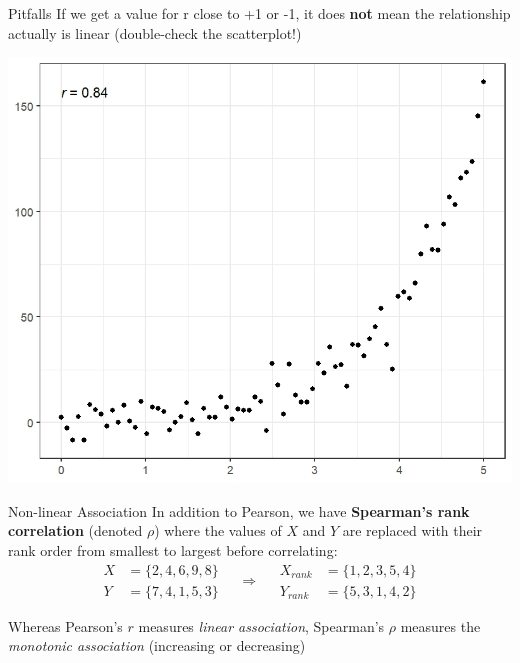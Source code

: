 \documentclass{beamer}
\begin{document}
\begin{frame}{Pitfalls}
If we get a value for r close to +1 or -1, it does \textbf{not} mean the relationship actually is linear (double-check the scatterplot!)
\begin{center}
    \includegraphics[scale=.55]{img/nonlinear_corr_ex.jpeg}
\end{center}
\end{frame}



\begin{frame}{Non-linear Association}
In addition to Pearson, we have \textbf{Spearman's rank correlation} (denoted $\rho$) where the values of $X$ and $Y$ are replaced with their rank order from smallest to largest before correlating:
$$
\begin{aligned}
X &= \{2,4,6,9,8 \} \\
Y &= \{7,4,1,5,3 \} 
\end{aligned}
 \quad
 \Longrightarrow
 \quad
\begin{aligned}
X_{rank} &= \{1,2,3,5,4 \} \\
Y_{rank} &= \{5,3,1,4, 2\} 
\end{aligned}
$$

\vspace{4mm}

Whereas Pearson's $r$ measures \textit{linear association}, Spearman's $\rho$ measures the \textit{monotonic association} (increasing or decreasing)

\end{frame}
\end{document}
